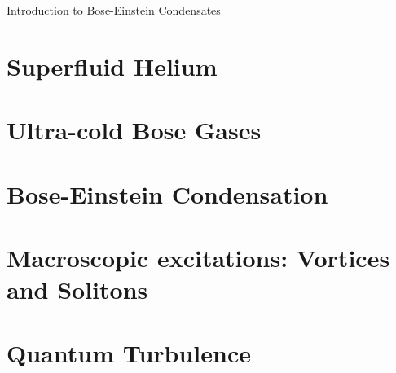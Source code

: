 \begin{chapter}{\label{cha:bose_gasses}Introduction to Bose-Einstein Condensates}
\section{Superfluid Helium}
\section{Ultra-cold Bose Gases}
\section{Bose-Einstein Condensation}
\section{Macroscopic excitations: Vortices and Solitons}
\section{Quantum Turbulence}
\end{chapter}